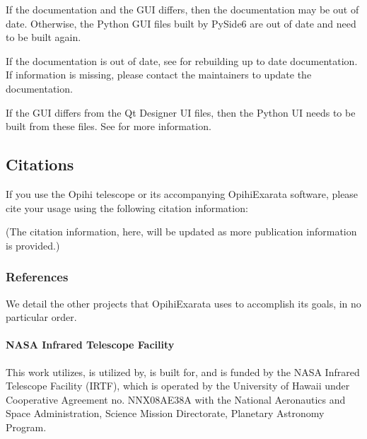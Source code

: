 \documentclass[letterpaper,11pt,english]{sphinxmanual}
\begin{document}
\sphinxAtStartPar
If the documentation and the GUI differs, then the documentation may be out of
date. Otherwise, the Python GUI files built by PySide6 are out of date and
need to be built again.

\sphinxAtStartPar
If the documentation is out of date, see
{\hyperref[\detokenize{technical/installation/documentation:technical-installation-documentation}]{}} for rebuilding up to date
documentation. If information is missing, please contact the maintainers to
update the documentation.

\sphinxAtStartPar
If the GUI differs from the Qt Designer UI files, then the Python UI needs to
be built from these files. See
{\hyperref[\detokenize{technical/architecture/graphical_user_interface:technical-architecture-graphical-user-interface-building-ui-files}]{}} for
more information.

\sphinxstepscope


\subsection{Citations}
\label{\detokenize{user/citations:citations}}\label{\detokenize{user/citations:user-citations}}\label{\detokenize{user/citations::doc}}
\sphinxAtStartPar
If you use the Opihi telescope or its accompanying OpihiExarata software, please cite your usage using the following citation information:

\sphinxAtStartPar
(The citation information, here, will be updated as more publication
information is provided.)


\subsubsection{References}
\label{\detokenize{user/citations:references}}
\sphinxAtStartPar
We detail the other projects that OpihiExarata uses to accomplish its goals,
in no particular order.


\paragraph{NASA Infrared Telescope Facility}
\label{\detokenize{user/citations:nasa-infrared-telescope-facility}}
\sphinxAtStartPar
This work utilizes, is utilized by, is built for, and is funded by the NASA
Infrared Telescope Facility (IRTF), which is operated by the University of
Hawaii under Cooperative Agreement no. NNX\sphinxhyphen{}08AE38A with the National
Aeronautics and Space Administration, Science Mission Directorate, Planetary
Astronomy Program.
\end{document}
